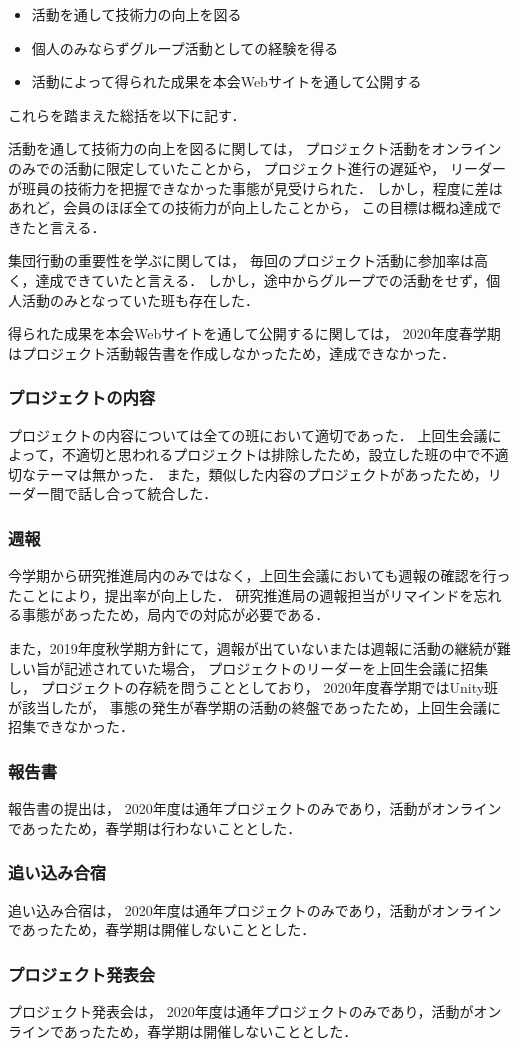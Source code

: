 \begin{itemize}
\item 活動を通して技術力の向上を図る
\item 個人のみならずグループ活動としての経験を得る
\item 活動によって得られた成果を本会Webサイトを通して公開する
\end{itemize}

これらを踏まえた総括を以下に記す．

活動を通して技術力の向上を図るに関しては，
プロジェクト活動をオンラインのみでの活動に限定していたことから，
プロジェクト進行の遅延や，
リーダーが班員の技術力を把握できなかった事態が見受けられた．
しかし，程度に差はあれど，会員のほぼ全ての技術力が向上したことから，
この目標は概ね達成できたと言える．

集団行動の重要性を学ぶに関しては，
毎回のプロジェクト活動に参加率は高く，達成できていたと言える．
しかし，途中からグループでの活動をせず，個人活動のみとなっていた班も存在した．

得られた成果を本会Webサイトを通して公開するに関しては，
2020年度春学期はプロジェクト活動報告書を作成しなかったため，達成できなかった．

\subsubsection*{プロジェクトの内容}
プロジェクトの内容については全ての班において適切であった．
上回生会議によって，不適切と思われるプロジェクトは排除したため，設立した班の中で不適切なテーマは無かった．
また，類似した内容のプロジェクトがあったため，リーダー間で話し合って統合した．

\subsubsection*{週報}
今学期から研究推進局内のみではなく，上回生会議においても週報の確認を行ったことにより，提出率が向上した．
研究推進局の週報担当がリマインドを忘れる事態があったため，局内での対応が必要である．

また，2019年度秋学期方針にて，週報が出ていないまたは週報に活動の継続が難しい旨が記述されていた場合，
プロジェクトのリーダーを上回生会議に招集し，
プロジェクトの存続を問うこととしており，
2020年度春学期ではUnity班が該当したが，
事態の発生が春学期の活動の終盤であったため，上回生会議に招集できなかった．

\subsubsection*{報告書}

報告書の提出は，
2020年度は通年プロジェクトのみであり，活動がオンラインであったため，春学期は行わないこととした．

\subsubsection*{追い込み合宿}
追い込み合宿は，
2020年度は通年プロジェクトのみであり，活動がオンラインであったため，春学期は開催しないこととした．

\subsubsection*{プロジェクト発表会}
プロジェクト発表会は，
2020年度は通年プロジェクトのみであり，活動がオンラインであったため，春学期は開催しないこととした．

